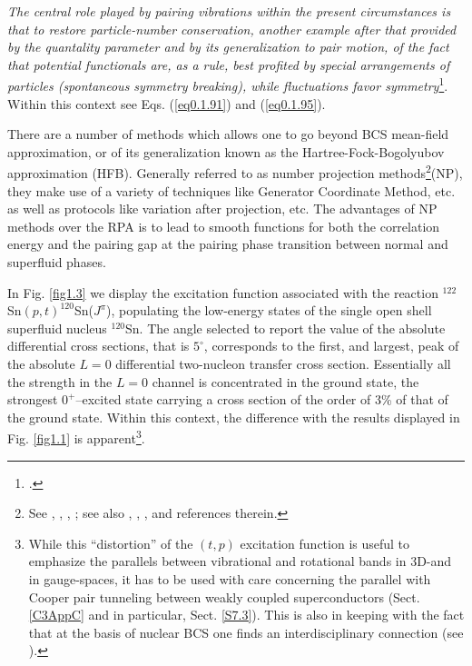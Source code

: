  
 
  \textit{The central role played by pairing vibrations  within the present circumstances is that to restore particle-number conservation, another example after that provided by the quantality parameter and by its generalization to pair motion, of the fact that potential functionals are, as a rule, best profited by special arrangements of particles (spontaneous symmetry breaking), while fluctuations  favor symmetry}\footnote{\cite{Anderson:84,Anderson:76}.}. Within this context see Eqs. (\ref{eq0.1.91}) and (\ref{eq0.1.95}).
  
  

  
  
  There are a number of methods which allows one to go beyond BCS mean-field approximation, or of its generalization known as the Hartree-Fock-Bogolyubov approximation (HFB). Generally referred to as number projection methods\footnote{See \cite{Allaart:74,Ring:80}, \cite{Egido:13}, \cite{Vaquero:13}, \cite{Robledo:13}; see also \cite{Frauendorf:13}, \cite{Ring:13}, \cite{Heenen:13}, and references therein.}(NP), they make use of a variety of techniques like Generator Coordinate Method, etc. as well as protocols like variation after projection, etc. The advantages of NP methods over the RPA is to lead to smooth functions for both the correlation energy and the pairing gap at the pairing phase transition between normal and superfluid phases. 
  

  In Fig. \ref{fig1.3} we display the excitation function associated with the reaction $^{122}$Sn$(p,t)^{120}$Sn($J^\pi$), populating the low-energy states of the single open shell  superfluid nucleus $^{120}$Sn. The angle selected to report the value of the absolute differential cross sections, that is $5^\circ$, corresponds to the first, and largest, peak of the absolute $L=0$ differential two-nucleon transfer cross section. Essentially all the strength in the $L=0$ channel is concentrated in the ground state, the strongest $0^+$--excited state carrying a cross section of the order of 3\% of that of the ground state. Within this context, the difference with the results displayed in Fig. \ref{fig1.1} is apparent\footnote{\label{f19} While this ``distortion'' of the $(t,p)$ excitation function is useful to emphasize the parallels between vibrational and rotational bands in 3D-and in gauge-spaces, it has to be used with care concerning the parallel with Cooper pair tunneling between weakly coupled superconductors (Sect. \ref{C3AppC} and in particular, Sect. \ref{S7.3}). This is also in keeping with the fact that at the basis of nuclear BCS one finds an  interdisciplinary connection (see \cite{Bohr:58}).}.
  
